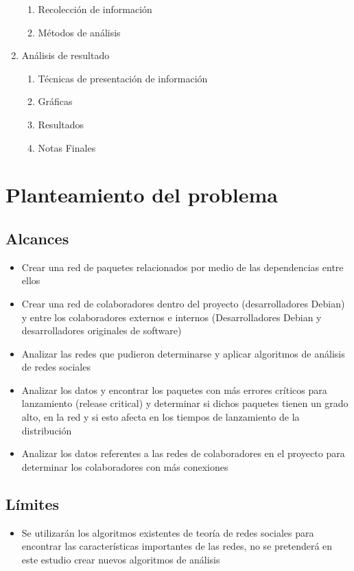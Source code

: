 \documentclass[12pt,titlepage]{report}
\begin{document}
\begin{enumerate}
\begin{enumerate}
  \item Recolección de información
  \item Métodos de análisis
  \end{enumerate}
\item Análisis de resultado
  \begin{enumerate}
  \item Técnicas de presentación de información
  \item Gráficas
  \item Resultados
  \item Notas Finales
  \end{enumerate}
\end{enumerate}

\chapter{Planteamiento del problema}
\section*{Alcances}
\begin{itemize}
\item Crear una red de paquetes relacionados por medio de las
  dependencias entre ellos
\item Crear una red de colaboradores dentro del proyecto
  (desarrolladores Debian) y entre los colaboradores externos e
  internos (Desarrolladores Debian y desarrolladores originales de
  software)
\item Analizar las redes que pudieron determinarse y aplicar
  algoritmos de análisis de redes sociales
\item Analizar los datos y encontrar los paquetes con más errores
  críticos para lanzamiento (release critical) y determinar si dichos
  paquetes tienen un grado alto, en la red y si esto afecta en los
  tiempos de lanzamiento de la distribución
\item Analizar los datos referentes a las redes de colaboradores en el
  proyecto para determinar los colaboradores con más conexiones
\end{itemize}
\section*{Límites}
\begin{itemize}
\item Se utilizarán los algoritmos existentes de teoría de redes
  sociales para encontrar las características importantes de las
  redes, no se pretenderá en este estudio crear nuevos algoritmos de
  análisis
\end{itemize}
\end{document}
